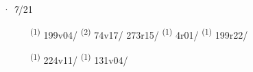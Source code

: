 \ENTRYEND
\noindent{} · \textit{7}/21 \LEMMALINE
\begin{description}
    \item[]  \textsuperscript{(1)} \mbox{199v04/} \CASEBREAK {} \textsuperscript{(2)} \mbox{74v17/} \mbox{273r15/} \CASEBREAK {} \textsuperscript{(1)} \mbox{4r01/} \textsuperscript{(1)} \mbox{199r22/}
    \item[]  \textsuperscript{(1)} \mbox{224v11/} \CASEBREAK {} \textsuperscript{(1)} \mbox{131v04/}
\end{description}
\ENTRYEND
